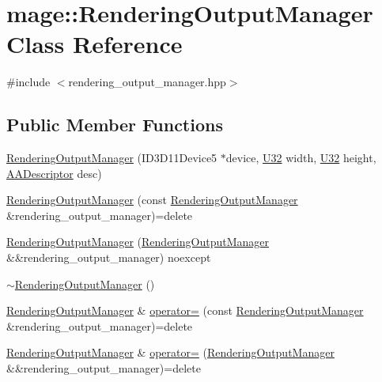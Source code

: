 \hypertarget{classmage_1_1_rendering_output_manager}{}\section{mage\+:\+:Rendering\+Output\+Manager Class Reference}
\label{classmage_1_1_rendering_output_manager}


{\ttfamily \#include $<$rendering\+\_\+output\+\_\+manager.\+hpp$>$}

\subsection*{Public Member Functions}
\begin{DoxyCompactItemize}
\item 
\hyperlink{classmage_1_1_rendering_output_manager_acbf3f32fdfaeb97e100c07b2197fe0b7}{Rendering\+Output\+Manager} (I\+D3\+D11\+Device5 $\ast$device, \hyperlink{namespacemage_a41c104c036fba3756a74e19f793eeaa1}{U32} width, \hyperlink{namespacemage_a41c104c036fba3756a74e19f793eeaa1}{U32} height, \hyperlink{namespacemage_a86cd40b8f2f42ca4d616cc6ec665a7f2}{A\+A\+Descriptor} desc)
\item 
\hyperlink{classmage_1_1_rendering_output_manager_aba36b667b7f34cc23858050a7713f4fa}{Rendering\+Output\+Manager} (const \hyperlink{classmage_1_1_rendering_output_manager}{Rendering\+Output\+Manager} \&rendering\+\_\+output\+\_\+manager)=delete
\item 
\hyperlink{classmage_1_1_rendering_output_manager_a526ebcc48f73cc5d296ce01323024829}{Rendering\+Output\+Manager} (\hyperlink{classmage_1_1_rendering_output_manager}{Rendering\+Output\+Manager} \&\&rendering\+\_\+output\+\_\+manager) noexcept
\item 
\hyperlink{classmage_1_1_rendering_output_manager_ac6c1b4ce353870ea603982623962b2f4}{$\sim$\+Rendering\+Output\+Manager} ()
\item 
\hyperlink{classmage_1_1_rendering_output_manager}{Rendering\+Output\+Manager} \& \hyperlink{classmage_1_1_rendering_output_manager_a486005f24c4ba471522e827574099c0b}{operator=} (const \hyperlink{classmage_1_1_rendering_output_manager}{Rendering\+Output\+Manager} \&rendering\+\_\+output\+\_\+manager)=delete
\item 
\hyperlink{classmage_1_1_rendering_output_manager}{Rendering\+Output\+Manager} \& \hyperlink{classmage_1_1_rendering_output_manager_a1e3ae29b6a7b888ba1cf5b93840d09d1}{operator=} (\hyperlink{classmage_1_1_rendering_output_manager}{Rendering\+Output\+Manager} \&\&rendering\+\_\+output\+\_\+manager)=delete

\end{DoxyCompactItemize}
